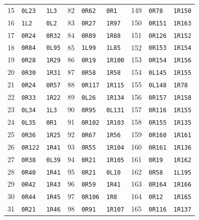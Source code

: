 \begin{longtable}{@{}rllrllrll@{}}
15 & \texttt{0L23} & \texttt{1L3} & 82 & \texttt{0R62} & \texttt{0R1} & 149 & \texttt{0R78} & \texttt{1R150}\\
16 & \texttt{1L2} & \texttt{0L2} & 83 & \texttt{0R27} & \texttt{1R97} & 150 & \texttt{0R151} & \texttt{1R163}\\
17 & \texttt{0R24} & \texttt{0R32} & 84 & \texttt{0R89} & \texttt{1R88} & 151 & \texttt{0R126} & \texttt{1R152}\\
18 & \texttt{0R84} & \texttt{0L95} & 85 & \texttt{1L99} & \texttt{1L85} & 152 & \texttt{0R153} & \texttt{1R154}\\
19 & \texttt{0R28} & \texttt{1R29} & 86 & \texttt{0R19} & \texttt{1R100} & 153 & \texttt{0R154} & \texttt{1R156}\\
20 & \texttt{0R30} & \texttt{1R31} & 87 & \texttt{0R58} & \texttt{1R58} & 154 & \texttt{0L145} & \texttt{1R155}\\
21 & \texttt{0R24} & \texttt{0R57} & 88 & \texttt{0R117} & \texttt{1R115} & 155 & \texttt{0L148} & \texttt{1R78}\\
22 & \texttt{0R33} & \texttt{1R22} & 89 & \texttt{0L26} & \texttt{1R134} & 156 & \texttt{0R157} & \texttt{1R158}\\
23 & \texttt{0L34} & \texttt{1L3} & 90 & \texttt{0R95} & \texttt{0L131} & 157 & \texttt{0R116} & \texttt{1R155}\\
24 & \texttt{0L35} & \texttt{0R1} & 91 & \texttt{0R102} & \texttt{1R103} & 158 & \texttt{0R155} & \texttt{1R135}\\
25 & \texttt{0R36} & \texttt{1R25} & 92 & \texttt{0R67} & \texttt{1R56} & 159 & \texttt{0R160} & \texttt{1R161}\\
26 & \texttt{0R122} & \texttt{1R41} & 93 & \texttt{0R55} & \texttt{1R104} & 160 & \texttt{0R161} & \texttt{1R136}\\
27 & \texttt{0R38} & \texttt{0L39} & 94 & \texttt{0R21} & \texttt{1R105} & 161 & \texttt{0R19} & \texttt{1R162}\\
28 & \texttt{0R40} & \texttt{1R41} & 95 & \texttt{0R21} & \texttt{0L10} & 162 & \texttt{0R58} & \texttt{1L195}\\
29 & \texttt{0R42} & \texttt{1R43} & 96 & \texttt{0R59} & \texttt{1R41} & 163 & \texttt{0R164} & \texttt{1R166}\\
30 & \texttt{0R44} & \texttt{1R45} & 97 & \texttt{0R106} & \texttt{1R8} & 164 & \texttt{0R12} & \texttt{1R165}\\
31 & \texttt{0R21} & \texttt{1R46} & 98 & \texttt{0R91} & \texttt{1R107} & 165 & \texttt{0R116} & \texttt{1R137}\\

\end{longtable}
